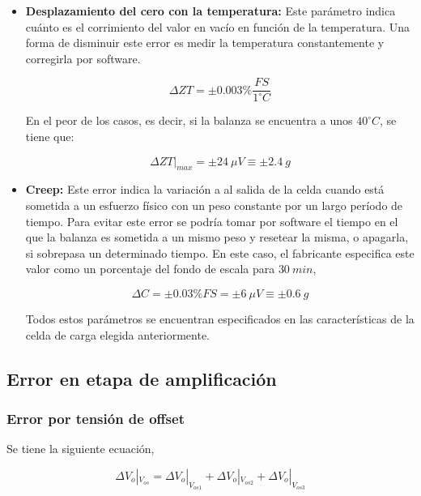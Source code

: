 \documentclass[12pt,A4paper,titlepage]{article}
\begin{document}
\begin{itemize}
    \bigskip
    \item \textbf{Desplazamiento del cero con la temperatura:} Este parámetro indica cuánto es el corrimiento del valor en vacío en función de la temperatura. Una forma de disminuir este error es medir la temperatura constantemente y corregirla por software.
    
    \begin{equation}
        \Delta ZT= \pm 0.003 \% \frac{FS}{1 ^\circ C}
    \end{equation}
    
    \bigskip
    En el peor de los casos, es decir, si la balanza se encuentra a unos \(40 ^\circ C \), se tiene que:
    
    \begin{equation}
        \Delta ZT|_{max} = \pm 24~\mu V \equiv \pm 2.4~g
    \end{equation}
    
    \bigskip
    \item \textbf{Creep:} Este error indica la variación a al salida de la celda cuando está sometida a un esfuerzo físico con un peso constante por un largo período de tiempo. Para evitar este error se podría tomar por software el tiempo en el que la balanza es sometida a un mismo peso y resetear la misma, o apagarla, si sobrepasa un determinado tiempo.
    En este caso, el fabricante especifica este valor como un porcentaje del fondo de escala para \(30~min\),
    
    \begin{equation}
        \Delta C = \pm 0.03 \% FS = \pm 6~\mu V \equiv \pm 0.6~g
    \end{equation}
    
    \bigskip
    Todos estos parámetros se encuentran especificados en las características de la celda de carga elegida anteriormente. 
\end{itemize}

\subsection{\textbf{Error en etapa de amplificación}}
\subsubsection{\textbf{Error por tensión de offset}}
\hspace{1mm} Se tiene la siguiente ecuación,

\begin{equation}
    \Delta V_o |_{V_{os}} = \Delta V_o |_{V_{os1}} + \Delta V_o |_{V_{os2}} + \Delta V_o |_{V_{os3}}
\end{equation}
\end{document}
